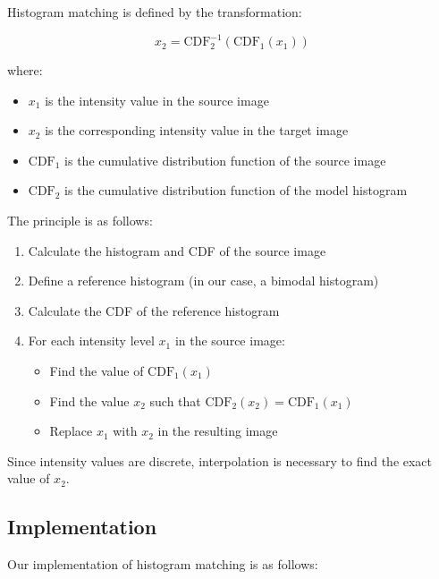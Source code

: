\documentclass[12pt,a4paper]{article}
\begin{document}
Histogram matching is defined by the transformation:

\begin{equation}
    x_2 = \text{CDF}_2^{-1}(\text{CDF}_1(x_1))
\end{equation}

where:
\begin{itemize}
    \item $x_1$ is the intensity value in the source image
    \item $x_2$ is the corresponding intensity value in the target image
    \item $\text{CDF}_1$ is the cumulative distribution function of the source image
    \item $\text{CDF}_2$ is the cumulative distribution function of the model histogram
\end{itemize}

The principle is as follows:
\begin{enumerate}
    \item Calculate the histogram and CDF of the source image
    \item Define a reference histogram (in our case, a bimodal histogram)
    \item Calculate the CDF of the reference histogram
    \item For each intensity level $x_1$ in the source image:
    \begin{itemize}
        \item Find the value of $\text{CDF}_1(x_1)$
        \item Find the value $x_2$ such that $\text{CDF}_2(x_2) = \text{CDF}_1(x_1)$
        \item Replace $x_1$ with $x_2$ in the resulting image
    \end{itemize}
\end{enumerate}

Since intensity values are discrete, interpolation is necessary to find the exact value of $x_2$.

\subsection{Implementation}

Our implementation of histogram matching is as follows:
\end{document}

